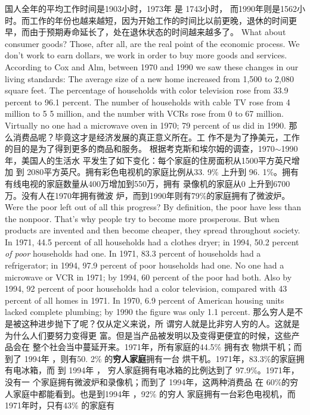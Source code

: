 \begin{paracol}{2}
国人全年的平均工作时间是1903小时，1973年 是 1743小时，
而1990年则是1562小时。而工作的年份也越来越短，因为开始工作的时间比以前更晚，退休的时间更早，而由于预期寿命延长了，处在退休状态的时间越来越多了。
\switchcolumn*
What about consumer goods? Those, after all, are the real
point of the economic process. We don't work to earn dollars,
we work in order to buy more goods and services. According to
Cox and Alm, between 1970 and 1990 we saw these changes in
our living standards: The average size of a new home increased
from 1,500 to 2,080 square feet. The percentage of households
with color television rose from 33.9 percent to 96.1 percent.
The number of households with cable TV rose from 4 million to
5 5 million, and the number with VCRs rose from 0 to 67 million. Virtually no one had a microwave oven in 1970; 79 percent of us did in 1990.
\switchcolumn
那么消费品呢？毕竟这才是经济发展的真正意义所在。工
作不是为了挣美元，工作的目的是为了得到更多的商品和服务。
根据考克斯和埃尔姆的调查，1970$\sim$1990年，美国人的生活水
平发生了如下变化：每个家庭的住房面积从1500平方英尺增加
到 2080平方英尺。拥有彩色电视机的家庭比例从33. 9\% 上升到
96. 1\%。拥有有线电视的家庭数量从400万增加到550万，拥有
录像机的家庭从0 上升到6700万。没有人在1970年拥有微波
炉，而到1990年则有79\%的家庭拥有了微波炉。
\switchcolumn*
Were the poor left out of all this progress? By definition, the
poor have less than the nonpoor. That's why people try to become more prosperous. But when products are invented and
then become cheaper, they spread throughout society. In 1971,
44.5 percent of all households had a clothes dryer; in 1994,
50.2 percent \textit{of poor} households had one. In 1971, 83.3 percent
of households had a refrigerator; in 1994, 97.9 percent of poor
households had one. No one had a microwave or VCR in 1971;
by 1994, 60 percent of the poor had both. Also by 1994, 92
percent of poor households had a color television, compared
with 43 percent of all homes in 1971. In 1970, 6.9 percent of
American housing units lacked complete plumbing; by 1990
the figure was only 1.1 percent.
\switchcolumn
那么穷人是不是被这种进步抛下了呢？仅从定义来说，所
谓穷人就是比非穷人穷的人。这就是为什么人们要努力变得更
富。但是当产品被发明以及变得更便宜的时候，这些产品会在
整个社会当中蔓延开来。1971年，所有家庭的44.5\% 拥有衣
物烘干机；而到了 1994年 ，则有50. 2\% 的\textbf{穷人家庭}拥有一台
烘干机。1971年，83.3\%的家庭拥有电冰箱，而 到 1994年 ，
穷人家庭拥有电冰箱的比例达到了 97.9\%。1971年，没有一
个家庭拥有微波炉和录像机；而到了 1994年，这两种消费品
在 60\%的穷人家庭中都能看到。也是到1994年 ，92\% 的穷人
家庭拥有一台彩色电视机，而 1971年时，只有43\% 的家庭有

\end{paracol}
